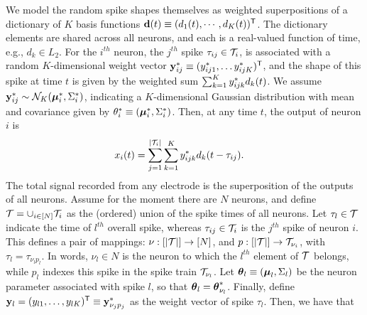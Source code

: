 We model the random spike shapes themselves as weighted superpositions of a dictionary of $K$ basis functions $\mathbf{d}(t) \equiv (d_1(t), \cdots, d_K(t))^{\mathsf{T}}$. The
dictionary elements are shared across all neurons, and each is a real-valued function of time, e.g., $d_k \in L_2$.
For the $i^{th}$ neuron, the $j^{th}$ spike $\tau_{ij} \in \mathcal{T}_i$, is associated with a random $K$-dimensional weight vector $\mathbf{y}^*_{ij} \equiv (y^*_{ij1}, \ldots y^*_{ijK})^{\mathsf{T}}$, and the 
shape of this spike at time $t$ is given by the weighted sum $\sum_{k=1}^K y^*_{ijk} d_k(t)$. We assume $\mathbf{y}^*_{ij} \sim \mathcal{N}_K(\boldsymbol{\mu}^*_i, \Sigma^*_i)$, indicating a $K$-dimensional 
Gaussian distribution with mean and covariance given by $\theta^*_i \equiv (\boldsymbol{\mu}^*_i, \Sigma^*_i)$.   Then, at any time $t$, the output of neuron $i$ is
\begin{align}
  x_{i}(t) &= \sum_{j=1}^{|\mathcal{T}_i|} \sum_{k=1}^K y^*_{ijk} d_k(t - \tau_{ij}).
\end{align}
% 
% 
% 
% 
{The total signal recorded from any electrode  is the superposition of the outputs of all neurons. Assume for the moment there are $N$
neurons, and define $\mathcal{T} = \cup_{i \in [N]} \mathcal{T}_i$ as
the (ordered) union of the spike times of all neurons. 
Let $\tau_l \in \mathcal{T}$ indicate the time of $l^{th}$ overall spike, whereas $\tau_{ij} \in \mathcal{T}_i$ is the $j^{th}$ spike of neuron $i$.
This defines a pair of mappings: $\nu:[|\mathcal{T}|]\rightarrow [N]$, and $p:[|\mathcal{T}|]\rightarrow \mathcal{T}_{\nu_i}$, with %
$\tau_l = \tau_{\nu_l p_l}$. 
In words, $\nu_l \in N$ is the neuron to which the $l^{th}$ element of $\mathcal{T}$ belongs, 
while $p_l$ indexes this spike in the spike train $\mathcal{T}_{\nu_l}$.
Let $\boldsymbol{\theta}_l \equiv (\boldsymbol{\mu}_l, \Sigma_l)$ be the neuron parameter associated with spike $l$, so that $\boldsymbol{\theta}_l = \boldsymbol{\theta}^*_{\nu_l}$. 
Finally, define $\mathbf{y}_l=(y_{l1}, \ldots, y_{lK})^{\mathsf{T}} \equiv \mathbf{y}^*_{\nu_j p_j}$ as the weight vector of spike $\tau_l$. Then, we have that}
